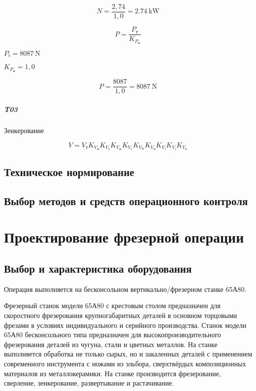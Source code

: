 \documentclass[14pt,russian,a4paper]{extreport}
\begin{document}
$$ N = \frac{2,74}{1,0} = \SI{2,74}{\kilo\watt} $$

$$ P = \frac{P_\text{т}}{K_{P_\text{м}}} $$

$ P_\text{t} = \SI{8087}{\newton} $ \cite[карта 46]{guzeev:rr} \par
$ K_{P_\text{м}} = 1,0 $ \cite[карта 53]{guzeev:rr}

$$ P = \frac{8087}{1,0} = \SI{8087}{\newton} $$

\subparagraph{T03} Зенкерование \

$$ V = V_\text{т} K_{V_\text{м}} K_{V_\text{з}} K_{V_\text{ж}} K_{V_\text{т}} K_{V_\text{w}} K_{V_\text{и}} K_{V_\text{l}} K_{V_\text{i}} K_{V_\text{п}} $$

\subsection{Техническое нормирование}
\subsection{Выбор методов и средств операционного контроля}


\section{Проектирование фрезерной операции}

\subsection{Выбор и характеристика оборудования}

Операция выполняется на бесконсольном вертикально\-/фрезерном станке 65А80.

Фрезерный станок модели 65А80 с крестовым столом предназначен для скоростного фрезерования крупногабаритных деталей в основном торцовыми фрезами в условиях индивидуального и серийного производства. Станок модели 65А80 бесконсольного типа предназначен для высокопроизводительного фрезерования деталей из чугуна, стали и цветных металлов. На станке выполняется обработка не только сырых, но и закаленных деталей с применением современного инструмента с ножами из эльбора, сверхтвёрдых композиционных материалов из металлокерамики. На станке производится фрезерование, сверление, зенкерование, развертывание и растачивание.
\end{document}
